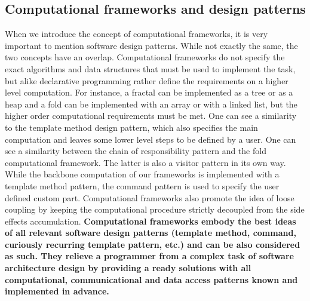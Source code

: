 \subsection{Computational frameworks and design patterns}
\label{background_design_frameworks}
\quad When we introduce the concept of computational frameworks, it is very important to mention software design patterns. While not exactly the same, the two concepts have an overlap. Computational frameworks do not specify the exact algorithms and data structures that must be used to implement the task, but alike declarative programming rather define the requirements on a higher level computation. For instance, a fractal can be implemented as a tree or as a heap and a fold can be implemented with an array or with a linked list, but the higher order computational requirements must be met. One can see a similarity to the template method design pattern, which also specifies the main computation and leaves some lower level steps to be defined by a user. One can see a similarity between the chain of responsibility pattern and the fold computational framework. The latter is also a visitor pattern in its own way. While the backbone computation of our frameworks is implemented with a template method pattern, the command pattern is used to specify the user defined custom part. Computational frameworks also promote the idea of loose coupling by keeping the computational procedure strictly decoupled from the side effects accumulation.\newline\null
\textbf{\quad Computational frameworks embody the best ideas of all relevant software design patterns (template method, command, curiously recurring template pattern, etc.) and can be also considered as such. They relieve a programmer from a complex task of software architecture design by providing a ready solutions with all computational, communicational and data access patterns known and implemented in advance.}
